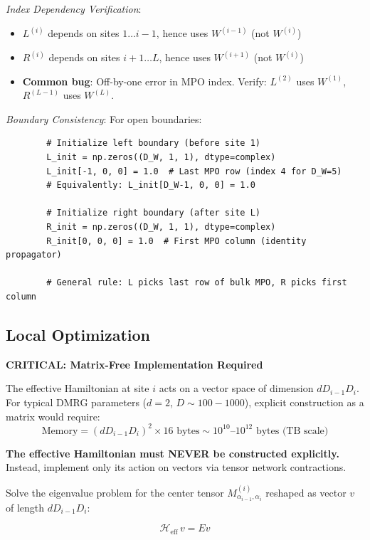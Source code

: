 \documentclass[aps,prb,onecolumn,scriptaddress]{revtex4-2}
\begin{document}
	\textit{Index Dependency Verification}:
	\begin{itemize}
		\item $L^{(i)}$ depends on sites $1 \dots i-1$, hence uses $W^{(i-1)}$ (not $W^{(i)}$)
		\item $R^{(i)}$ depends on sites $i+1 \dots L$, hence uses $W^{(i+1)}$ (not $W^{(i)}$)  
		\item \textbf{Common bug}: Off-by-one error in MPO index. Verify: $L^{(2)}$ uses $W^{(1)}$, $R^{(L-1)}$ uses $W^{(L)}$.
	\end{itemize}
	
	\textit{Boundary Consistency}: For open boundaries:
	\begin{verbatim}
		# Initialize left boundary (before site 1)
		L_init = np.zeros((D_W, 1, 1), dtype=complex)
		L_init[-1, 0, 0] = 1.0  # Last MPO row (index 4 for D_W=5)
		# Equivalently: L_init[D_W-1, 0, 0] = 1.0
		
		# Initialize right boundary (after site L)
		R_init = np.zeros((D_W, 1, 1), dtype=complex)
		R_init[0, 0, 0] = 1.0  # First MPO column (identity propagator)
		
		# General rule: L picks last row of bulk MPO, R picks first column
	\end{verbatim}
	
	\subsection{Local Optimization}
	
	\textbf{CRITICAL: Matrix-Free Implementation Required}
	
	The effective Hamiltonian at site $i$ acts on a vector space of dimension $d D_{i-1} D_i$. For typical DMRG parameters ($d=2$, $D \sim 100-1000$), explicit construction as a matrix would require:
	\begin{equation}
		\text{Memory} = (d D_{i-1} D_i)^2 \times 16\text{ bytes} \sim 10^{10}\text{--}10^{12} \text{ bytes (TB scale)}
	\end{equation}
	
	\textbf{The effective Hamiltonian must NEVER be constructed explicitly.} Instead, implement only its action on vectors via tensor network contractions.
	
	Solve the eigenvalue problem for the center tensor $M^{(i)}_{\alpha_{i-1},\alpha_i}$ reshaped as vector $v$ of length $d D_{i-1} D_i$:
	
	\begin{equation}
		\mathcal{H}_{\text{eff}} \, v = E v
	\end{equation}
	
\end{document}

